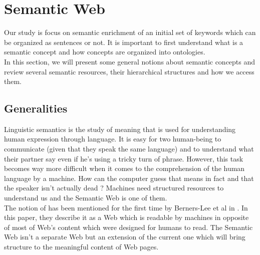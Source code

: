 
\chapter{Semantic Web} %

\label{chapter:SemanticWebResources} %


Our study is focus on semantic enrichment of an initial set of keywords which can be organized as sentences or not. It is important to first understand what is a semantic concept and how concepts are organized into ontologies.\\ 

In this section, we will present some general notions about semantic concepts and review several semantic resources, their hierarchical structures and how we access them.

\section{Generalities} %
\label{sec:generalities}
Linguistic semantics is the study of meaning that is used for understanding human expression through language. It is easy for two human-being to communicate (given that they speak the same language) and to understand what their partner say even if he's using a tricky turn of phrase. However, this task becomes way more difficult when it comes to the comprehension of the human language by a machine. How can the computer guess that  means in fact  and that the speaker isn't actually dead ? Machines need structured resources to understand us and the Semantic Web is one of them.\\

The notion of  has been mentioned for the first time by Berners-Lee et al in \cite{berners2001semantic}. In this paper, they describe it as a Web which is readable by machines in opposite of most of Web's content which were designed for humans to read. The Semantic Web isn't a separate Web but an extension of the current one which will bring structure to the meaningful content of Web pages.\\

